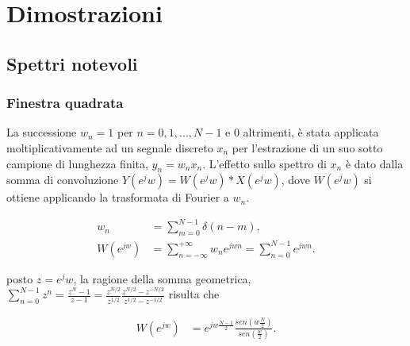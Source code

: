 
\chapter{Dimostrazioni}
\label{Appendix1}



\section{Spettri notevoli}

\subsection{Finestra quadrata}
La successione $w_{n}=1$ per $n=0,1, ..., N-1$ e $0$ altrimenti, è stata applicata moltiplicativamente ad un segnale discreto $x_{n}$ per l'estrazione di un suo sotto campione di lunghezza finita, $y_{n} = w_{n}x_{n}$.
L'effetto sullo spettro di $x_{n}$ è dato dalla somma di convoluzione $ Y(e^jw) = W(e^jw)*X(e^jw) $, dove $ W(e^jw) $ si ottiene applicando la trasformata di Fourier a $w_{n}$.

\begin{align*}
w_{n} 		& = \sum_{m=0}^{N-1} \delta(n-m),	\\
W(e^{jw} ) 	& = \sum_{n=-\infty}^{+\infty} w_{n} e^{jwn} = \sum_{n=0}^{N-1} e^{jwn}.
\end{align*}

posto $z = e^jw $, la ragione della somma geometrica,
$\sum_{n=0}^{N-1} z^{n} = \frac{z^{N}-1}{z-1} = \frac{z^{N/2}}{z^{1/2}}\frac{z^{N/2}-z^{-N/2}}{z^{1/2}-z^{-1/2}} $
risulta che

\begin{align*}
W(e^{jw} ) 	& = e^{jw\frac{N-1}{2}}\frac{sen(w\frac{N}{2})}{sen(\frac{w}{2})}.
\end{align*}



